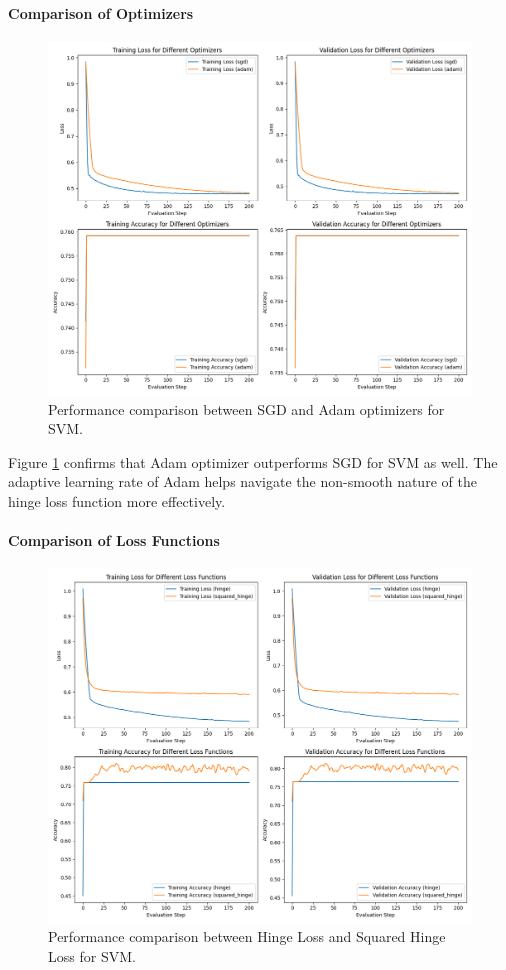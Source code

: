 \documentclass[journal, a4paper]{IEEEtran}
\begin{document}
\paragraph{Comparison of Optimizers}
\begin{figure}[H]
\centering
\includegraphics[width=\linewidth]{svm_optimizers.png}
\caption{Performance comparison between SGD and Adam optimizers for SVM.}
\label{fig:svm_opt}
\end{figure}

Figure \ref{fig:svm_opt} confirms that Adam optimizer outperforms SGD for SVM as well. The adaptive learning rate of Adam helps navigate the non-smooth nature of the hinge loss function more effectively.

\paragraph{Comparison of Loss Functions}
\begin{figure}[H]
\centering
\includegraphics[width=\linewidth]{svm_loss_functions.png}
\caption{Performance comparison between Hinge Loss and Squared Hinge Loss for SVM.}
\label{fig:svm_loss}
\end{figure}
\end{document}
